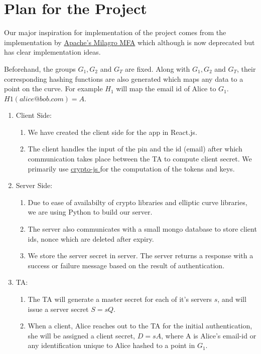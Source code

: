 \documentclass[]{article}   %
\begin{document}
\section*{Plan for the Project}
Our major inspiration for implementation of the project comes from the implementation by \href{https://web.archive.org/web/20161107110119/http://docs.milagro.io/en/mfa/getting-started/milagro-mfa-developer-guide.html}{Apache's Milagro MFA} which although is now deprecated but has clear implementation ideas.

Beforehand, the groups $G_1, G_2$ and $G_T$ are fixed. Along with $G_1, G_2$ and $G_T$, their corresponding hashing functions are also generated which maps any data to a point on the curve. For example $H_1$ will map the email id of Alice to $G_1$. $H1(alice@bob.com) = A$.

\begin{enumerate}
    \item Client Side:
        \begin{enumerate}
            \item We have created the client side for the app in React.js.
            \item The client handles the input of the pin and the id (email) after which communication takes place between the TA to compute client secret. We primarily use \href{https://www.npmjs.com/package/crypto-js}{ crypto-js } for the computation of the tokens and keys.
        \end{enumerate}
    \item Server Side:
    \begin{enumerate}
        \item Due to ease of availabilty of crypto libraries and elliptic curve libraries, we are using Python to build our server.
        \item The server also communicates with a small mongo database to store client ids, nonce which are deleted after expiry. 
        \item We store the server secret in server. The server returns a response with a success or failure message based on the result of authentication. 
    \end{enumerate}
    \item TA:
    \begin{enumerate}
        \item The TA will generate a master secret for each of it's servers $s$, and will issue a server secret $S = sQ$.

        \item When a client, Alice reaches out to the TA for the initial authentication, she will be assigned a client secret, $D = sA$, where A is Alice's email-id or any identification unique to Alice hashed to a point in $G_1$.
    \end{enumerate}
\end{enumerate}
\newpage
\end{document}
